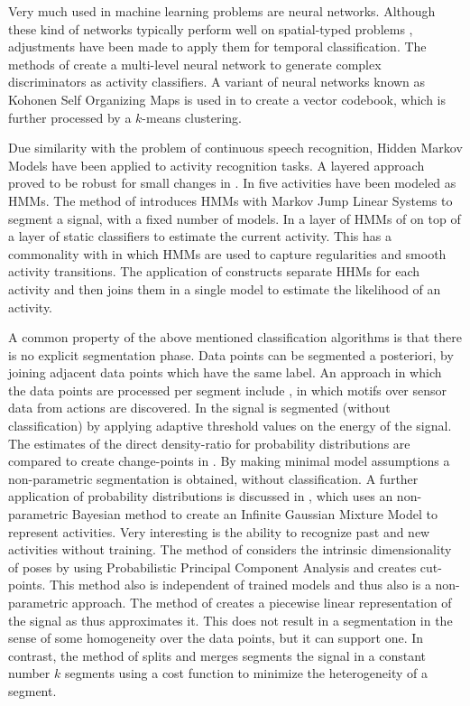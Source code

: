 Very much used in machine learning problems are neural networks. 
Although these kind of networks typically perform well on spatial-typed problems , adjustments have been made to apply them for temporal classification.
The methods of \cite{yang2008using, kwapisz2011activity} create a multi-level neural network to generate complex discriminators as activity classifiers.
A variant of neural networks known as Kohonen Self Organizing Maps is used in \cite{krause2003unsupervised} to create a vector codebook, which is further processed by a $k$-means clustering.

Due similarity with the problem of continuous speech recognition, Hidden Markov Models have been applied to activity recognition tasks.
A layered approach proved to be robust for small changes in \cite{perdikis2008recognition}.
In \cite{shi2009towards} five activities have been modeled as HMMs.
The method of \cite{fox2010bayesian} introduces HMMs with Markov Jump Linear Systems to segment a signal, with a fixed number of models.
In \cite{lester2006practical} a layer of HMMs of on top of a layer of static classifiers to estimate the current activity.
This has a commonality with \cite{lester2005hybrid} in which HMMs are used to capture regularities and smooth activity transitions.
The application of \cite{guenterberg2009distributed} constructs separate HHMs for each activity and then joins them in a single model to estimate the likelihood of an activity.

A common property of the above mentioned classification algorithms is that there is no explicit segmentation phase.
Data points can be segmented a posteriori, by joining adjacent data points which have the same label.
An approach in which the data points are processed per segment include \cite{minnen2006discovering}, in which motifs over sensor data from actions are discovered.
In \cite{guenterberg2009automatic} the signal is segmented (without classification) by applying adaptive threshold values on the energy of the signal.
The estimates of the direct density-ratio for probability distributions are compared to create change-points in \cite{kawahara2009change}.
By making minimal model assumptions a non-parametric segmentation is obtained, without classification.
A further application of probability distributions is discussed in \cite{ahmed2012non}, which uses an non-parametric Bayesian method to create an Infinite Gaussian Mixture Model to represent activities.
Very interesting is the ability to recognize past and new activities without training.
The method of \cite{barbivc2004segmenting} considers the intrinsic dimensionality of poses by using Probabilistic Principal Component Analysis and creates cut-points.
This method also is independent of trained models and thus also is a non-parametric approach.
The method of \cite{keogh2001online} creates a piecewise linear representation of the signal as thus approximates it.
This does not result in a segmentation in the sense of some homogeneity over the data points, but it can support one.
In contrast, the method of \cite{himberg2001time} splits and merges segments the signal in a constant number $k$ segments using a cost function to minimize the heterogeneity of a segment.

